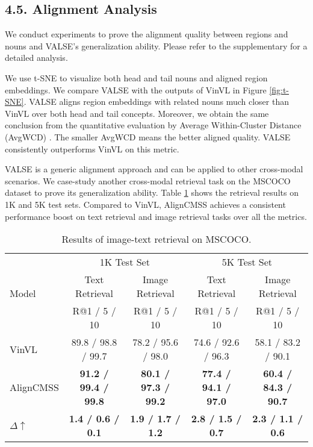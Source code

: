 \documentclass[letterpaper]{article} \usepackage{aaai24}  \usepackage{times}  \usepackage{helvet}  \usepackage{courier}  \usepackage[hyphens]{url}  \usepackage{graphicx} \urlstyle{rm} \def\UrlFont{\rm}  \usepackage{natbib}  \usepackage{caption} \frenchspacing  \setlength{\pdfpagewidth}{8.5in}  \setlength{\pdfpageheight}{11in}
\begin{document}
\subsection{4.5. Alignment Analysis}
We conduct experiments to prove the alignment quality between regions and nouns and VALSE's generalization ability. Please refer to the supplementary for a detailed analysis.

We use t-SNE \cite{van2008visualizing} to visualize both head and tail nouns and aligned region embeddings. We compare VALSE with the outputs of VinVL in Figure \ref{fig:t-SNE}. VALSE aligns region embeddings with related nouns much closer than VinVL over both head and tail concepts. Moreover, we obtain the same conclusion from the quantitative evaluation by Average Within-Cluster Distance (AvgWCD) \cite{edwards1965method}. 
The smaller AvgWCD means the better aligned quality. VALSE consistently outperforms VinVL on this metric. 


 VALSE is a generic alignment approach and can be applied to other cross-modal scenarios.
We case-study another cross-modal retrieval task on the MSCOCO dataset \cite{10.1007/978-3-319-10602-1_48} to prove its generalization ability. Table \ref{tab:coco} shows the retrieval results on 1K and 5K test sets. Compared to VinVL, AlignCMSS achieves a consistent performance boost on text retrieval and image retrieval tasks over all the metrics. 

\begin{table}[t]
\centering
\setlength{\abovecaptionskip}{5pt}
\setlength{\belowcaptionskip}{-10pt}
\setlength{\tabcolsep}{0.91mm}
\scalebox{0.93}
{\scriptsize
\renewcommand\arraystretch{1.1}
\begin{tabular}{l|cc|cc}
\toprule
\multirow{3}{*}{Model} & \multicolumn{2}{c|}{1K Test Set}          & \multicolumn{2}{c}{5K Test Set}         \\
                       & Text Retrieval      & Image Retrieval    & Text Retrieval     & Image Retrieval    \\ \cline{2-5} 
                       & R@1 / 5 / 10       & R@1 / 5 / 10      & R@1 / 5 / 10      & R@1 / 5 / 10      \\ \hline
VinVL                  & 89.8 /  98.8 / 99.7 & 78.2 / 95.6 / 98.0 & 74.6 / 92.6 / 96.3 & 58.1 / 83.2 / 90.1 \\
AlignCMSS                  & \textbf{91.2 /  99.4 / 99.8} & \textbf{80.1 / 97.3 / 99.2} &  \textbf{77.4 / 94.1 / 97.0}    & \textbf{60.4 / 84.3 / 90.7}    \\
$\Delta\uparrow$       & \textbf{\hphantom{1}1.4 /\hphantom{1} 0.6 / \hphantom{1}0.1}     & \textbf{\hphantom{1}1.9 / \hphantom{1}1.7 / \hphantom{1}1.2}    & \textbf{\hphantom{1}2.8 / \hphantom{1}1.5 / \hphantom{1}0.7}                  & \textbf{\hphantom{1}2.3 / \hphantom{1}1.1 / \hphantom{1}0.6}           \\ \bottomrule
\end{tabular}}
\vspace{1pt}
\caption{Results of image-text retrieval on MSCOCO.}
\label{tab:coco}
\end{table}
\end{document}
